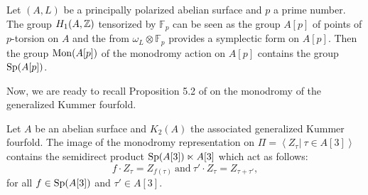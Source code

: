 \begin{rmk}
Let $(A,L)$ be a principally polarized abelian surface and $p$ a prime number. The group $H_1(A,\mathbb{Z})$ tensorized by $\mathbb{F}_p$ can be seen as the group $A[p]$ of points of $p$-torsion on $A$ and the from $\omega_L\otimes\mathbb{F}_p$ provides a symplectic form on $A[p]$. Then the group $\operatorname{Mon} (A[p])$ of the monodromy action on $A[p]$ contains the group $\operatorname{Sp}(A[p])$. 
\end{rmk}
Now, we are ready to recall Proposition 5.2 of \cite{Hassett} on the monodromy of the generalized Kummer fourfold.
\begin{prop}
Let $A$ be an abelian surface and $K_2(A)$ the associated generalized Kummer fourfold. 
The image of the monodromy representation on $\Pi=\left\langle\left. Z_\tau\right|\ \tau\in A[3]\right\rangle$ contains the semidirect product
$\operatorname{Sp}(A[3])\ltimes A[3]$ which act as follows:
$$f\cdot Z_\tau= Z_{f(\tau)}\ \text{and}\ \tau'\cdot Z_\tau= Z_{\tau+\tau'},$$
for all $f\in \operatorname{Sp}(A[3])$ and $\tau'\in A[3]$.
\end{prop}